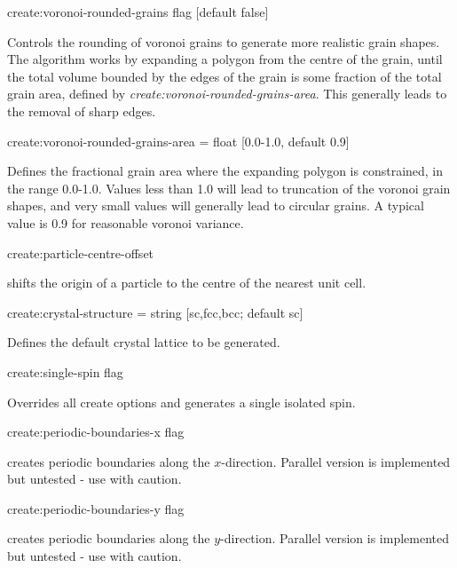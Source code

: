 {\zicf create:voronoi-rounded-grains flag [default false]} Controls the rounding of voronoi grains to generate more realistic grain shapes. The algorithm works by expanding a polygon from the centre of the grain, until the total volume bounded by the edges of the grain is some fraction of the total grain area, defined by \textit{create:voronoi-rounded-grains-area}. This generally leads to the removal of sharp edges. \\ \par

{\zicf create:voronoi-rounded-grains-area = float [0.0-1.0, default 0.9]} Defines the fractional grain area where the expanding polygon is constrained, in the range 0.0-1.0. Values less than 1.0 will lead to truncation of the voronoi grain shapes, and very small values will generally lead to circular grains. A typical value is 0.9 for reasonable voronoi variance.\\ \par

{\zicf create:particle-centre-offset} shifts the origin of a particle to the centre of the nearest unit cell.\\ \par

{\zicf create:crystal-structure = string [sc,fcc,bcc; default sc]} Defines the default crystal lattice to be generated.\\ \par

{\zicf create:single-spin flag} Overrides all create options and generates a single isolated spin.\\ \par

{\zicf create:periodic-boundaries-x flag} creates periodic boundaries along the $x$-direction. Parallel version is implemented but untested - use with caution.\\ \par

{\zicf create:periodic-boundaries-y flag} creates periodic boundaries along the $y$-direction. Parallel version is implemented but untested - use with caution.\\ \par

